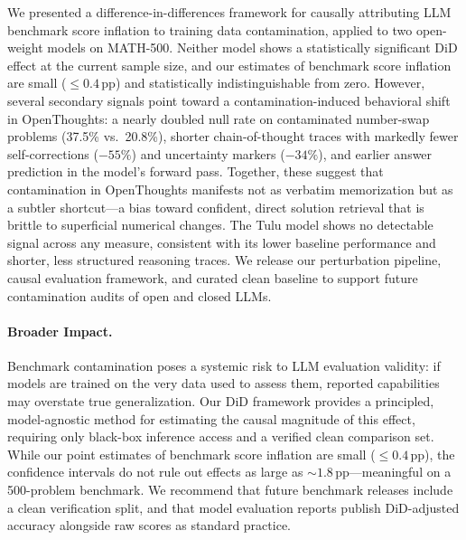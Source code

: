 \documentclass{article} %
\begin{document}
We presented a difference-in-differences framework for causally attributing LLM benchmark score inflation to training data contamination, applied to two open-weight models on MATH-500. Neither model shows a statistically significant DiD effect at the current sample size, and our estimates of benchmark score inflation are small ($\leq 0.4$\,pp) and statistically indistinguishable from zero. However, several secondary signals point toward a contamination-induced behavioral shift in OpenThoughts: a nearly doubled null rate on contaminated number-swap problems (37.5\% vs.\ 20.8\%), shorter chain-of-thought traces with markedly fewer self-corrections ($-55\%$) and uncertainty markers ($-34\%$), and earlier answer prediction in the model's forward pass. Together, these suggest that contamination in OpenThoughts manifests not as verbatim memorization but as a subtler shortcut---a bias toward confident, direct solution retrieval that is brittle to superficial numerical changes. The Tulu model shows no detectable signal across any measure, consistent with its lower baseline performance and shorter, less structured reasoning traces. We release our perturbation pipeline, causal evaluation framework, and curated clean baseline to support future contamination audits of open and closed LLMs.

\paragraph{Broader Impact.}
Benchmark contamination poses a systemic risk to LLM evaluation validity: if models are trained on the very data used to assess them, reported capabilities may overstate true generalization. Our DiD framework provides a principled, model-agnostic method for estimating the causal magnitude of this effect, requiring only black-box inference access and a verified clean comparison set. While our point estimates of benchmark score inflation are small ($\leq 0.4$\,pp), the confidence intervals do not rule out effects as large as ${\sim}1.8$\,pp---meaningful on a 500-problem benchmark. We recommend that future benchmark releases include a clean verification split, and that model evaluation reports publish DiD-adjusted accuracy alongside raw scores as standard practice.




\appendix
\end{document}

